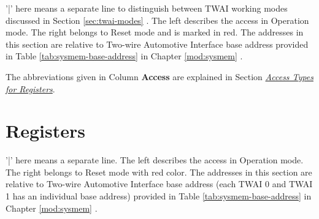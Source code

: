 \documentclass[main\_\_EN.tex]{subfiles}
\begin{document}
'|' here means a separate line to distinguish between TWAI working modes discussed in Section \ref{sec:twai-modes} \textit{}. The left describes the access in Operation mode. The right belongs to Reset mode and is marked in red. The addresses in this section are relative to Two-wire Automotive Interface base address provided in Table \ref{tab:sysmem-base-address} in Chapter \ref{mod:sysmem} \textit{}.

The abbreviations given in Column \textbf{Access} are explained in Section \hyperref[glossary-access-types]{\textit{Access Types for Registers}}.






\clearpage
\section{Registers}

'|' here means a separate line. The left describes the access in Operation mode. The right belongs to Reset mode with red color. The addresses in this section are relative to Two-wire Automotive Interface base address (each TWAI 0 and TWAI 1 has an individual base address) provided in Table \ref{tab:sysmem-base-address} in Chapter \ref{mod:sysmem} \textit{}.


\end{document}
